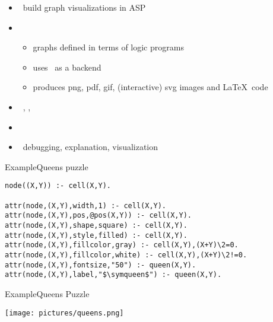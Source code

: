 \begin{frame}{\clingraph}
  \begin{itemize}
    \item {} \ build graph visualizations in ASP
    \item {}
      \begin{itemize}
      \item graphs defined in terms of logic programs %
      \item uses \graphviz\ as a backend
      \item produces png, pdf, gif, (interactive) svg images and \LaTeX\ code
      \end{itemize}
    \item {}   \ \clingo, \clorm, \graphviz
    \item {}   \ \cite{hasascst22a}
    \item {} \ debugging, explanation, visualization %
  \end{itemize}
\end{frame}


\begin{frame}[fragile]{Example}{Queens puzzle}
  \begin{adjustbox}{max totalsize={\textwidth}{.7\textheight},keepaspectratio}
    \begin{lstlisting}[mathescape]
node((X,Y)) :- cell(X,Y).

attr(node,(X,Y),width,1) :- cell(X,Y).
attr(node,(X,Y),pos,@pos(X,Y)) :- cell(X,Y).
attr(node,(X,Y),shape,square) :- cell(X,Y).
attr(node,(X,Y),style,filled) :- cell(X,Y).
attr(node,(X,Y),fillcolor,gray) :- cell(X,Y),(X+Y)\2=0.
attr(node,(X,Y),fillcolor,white) :- cell(X,Y),(X+Y)\2!=0.
attr(node,(X,Y),fontsize,"50") :- queen(X,Y).
attr(node,(X,Y),label,"$\symqueen$") :- queen(X,Y).
  \end{lstlisting}
  \end{adjustbox}

\end{frame}
  \begin{frame}[fragile]{Example}{Queens Puzzle}

  \texttt{[image: pictures/queens.png]}
  \end{frame}

%
